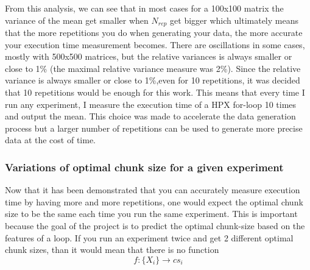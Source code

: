 \documentclass[12pt]{article}
\begin{document}
From this analysis, we can see that in most cases for a 100x100 matrix the variance of the mean get smaller when $N_{rep}$ get bigger which ultimately means that the more repetitions you do when generating your data, the more accurate your execution time measurement becomes. There are oscillations in some cases, mostly with 500x500 matrices, but the relative variances is always smaller or close to 1\% (the maximal relative variance measure was 2\%). Since the relative variance is always smaller or close to 1\%,even for 10 repetitions, it was decided that 10 repetitions would be enough for this work. This means that every time I run any experiment, I measure the execution time of a HPX for-loop 10 times and output the mean. This choice was made to accelerate the data generation process but a larger number of repetitions can be used to generate more precise data at the cost of time.

\subsubsection{Variations of optimal chunk size for a given experiment}

Now that it has been demonstrated that you can accurately measure execution time by having more and more repetitions, one would expect the optimal chunk size to be the same each time you run the same experiment. This is important because the goal of the project is to predict the optimal chunk-size based on the features of a loop. If you run an experiment twice and get 2 different optimal chunk sizes, than it would mean that there is no function $$f:\{X_i\} \rightarrow cs_i$$ 
\end{document}
